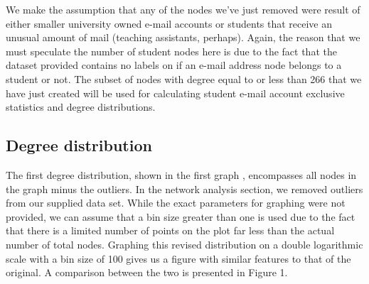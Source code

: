 \documentclass[11pt]{article}
\begin{document}
\begin{multicols}{2}
We make the assumption that any of the nodes we've just removed were result of either smaller university owned e-mail accounts or students that receive an unusual amount of mail (teaching assistants, perhaps). Again, the reason that we must speculate the number of student nodes here is due to the fact that the dataset provided contains no labels on if an e-mail address node belongs to a student or not. The subset of nodes with degree equal to or less than 266 that we have just created will be used for calculating student e-mail account exclusive statistics and degree distributions.

\subsection{Degree distribution}
\hspace*{\parindent}The first degree distribution, shown in the first graph \cite{1}, encompasses all nodes in the graph minus the outliers. In the network analysis section, we removed outliers from our supplied data set. While the exact parameters for graphing were not provided, we can assume that a bin size greater than one is used due to the fact that there is a limited number of points on the plot far less than the actual number of total nodes. Graphing this revised distribution on a double logarithmic scale with a bin size of 100 gives us a figure with similar features to that of the original. A comparison between the two is presented in Figure 1.


\end{multicols}
\end{document}
